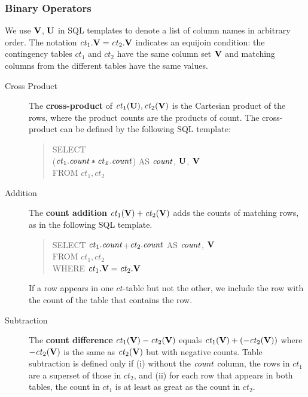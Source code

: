 \documentclass{acm_proc_article-sp}
\newcommand{\ct}{\mathit{ct}}
\begin{document}
\subsubsection{Binary Operators} \label{sec:bin}
We use $\mathbf{V}$, $\mathbf{U}$ in SQL templates to denote a list of column names in arbitrary order. The notation $\ct_{1}.\set{V} = \ct_{2}.\set{V}$ indicates an equijoin condition: the contingency tables $\ct_{1}$ and $\ct_{2}$ have the same column set $\mathbf{V}$ and matching columns from the different tables have the same values.
\begin{description}
\item[Cross Product] 
The \textbf{cross-product} of $\ct_{1}(\set{U}),\ct_{2}(\set{V})$ is the Cartesian product of the rows, where the product counts are the products of count. The cross-product can be defined by the following SQL template:

\begin{quote}
SELECT \\($\ct_{1}.\qcount *\ct_{2}.\qcount$) AS $\it{count}$,  $\mathbf{U}$, $\mathbf{V}$\\
FROM  $\ct_{1},\ct_{2}$
\end{quote}


\item[Addition] 
 The \textbf{count addition} $\ct_{1}(\set{V}) + \ct_{2}(\set{V})$ adds the counts of matching rows, as in the following SQL template.
\begin{quote}
SELECT %
$\ct_{1}.\qcount$+$\ct_{2}.\qcount$ AS $\it{count}$, $\mathbf{V}$ \\%
FROM  $\ct_{1},\ct_{2}$\\
WHERE $\ct_{1}.\set{V} = \ct_{2}.\set{V}$
\end{quote}

If a row appears in one $\ct$-table but not the other, we include the row with the count of the table that contains the row. 

\item[Subtraction] %
The \textbf{count difference} $\ct_{1}(\set{V}) - \ct_{2}(\set{V})$ equals $\ct_{1}(\set{V}) + (- \ct_{2}(\set{V}))$ where $- \ct_{2}(\set{V})$ is the same as $\ct_{2}(\set{V})$ but with negative counts. 
Table subtraction is defined only if (i) without the $\it{count}$ column, the rows in $\ct_{1}$ are a superset of those in $\ct_{2}$, and (ii) for each row that appears in both tables, the count in $\ct_{1}$ is at least as great as the count in $\ct_{2}$.
\end{description}
\end{document}
